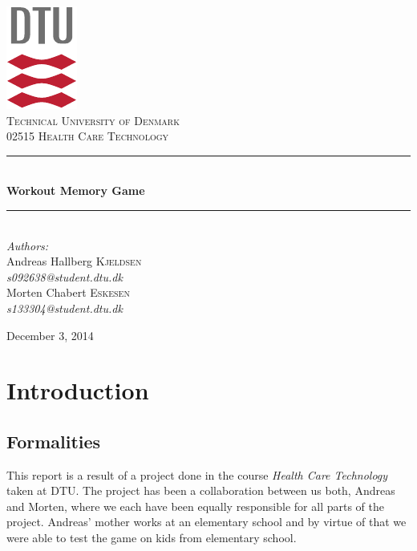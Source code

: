 \documentclass[11pt]{report}
\newcommand{\HRule}{\rule{\linewidth}{0.5mm}}
\begin{document}
\begin{titlepage}
\begin{center}

\includegraphics[scale=2.0]{../GFX/dtu_logo.pdf}\\[1cm]

\textsc{\LARGE Technical University of Denmark}\\[1.5cm]

\textsc{\Large 02515 Health Care Technology}\\[0.5cm]


\HRule \\[0.4cm]
{\huge \bfseries Workout Memory Game}\\[0.1cm]
\HRule \\[1.5cm]

\large
\emph{Authors:}
\\[10pt]
Andreas Hallberg \textsc{Kjeldsen}\\
\emph{s092638@student.dtu.dk}
\\[10pt]
Morten Chabert \textsc{Eskesen}\\
\emph{s133304@student.dtu.dk}

\vfill

{\large December 3, 2014}

\end{center}
\end{titlepage}

\begingroup
\tableofcontents
\let\clearpage\relax
\listoffigures
\let\clearpage\relax
\listoftables
\endgroup

\chapter{Introduction}
\section{Formalities}
This report is a result of a project done in the course \emph{Health Care Technology} taken at DTU. The project has been a collaboration between us both, Andreas and Morten, where we each have been equally responsible for all parts of the project. Andreas' mother works at an elementary school and by virtue of that we were able to test the game on kids from elementary school.
\end{document}

